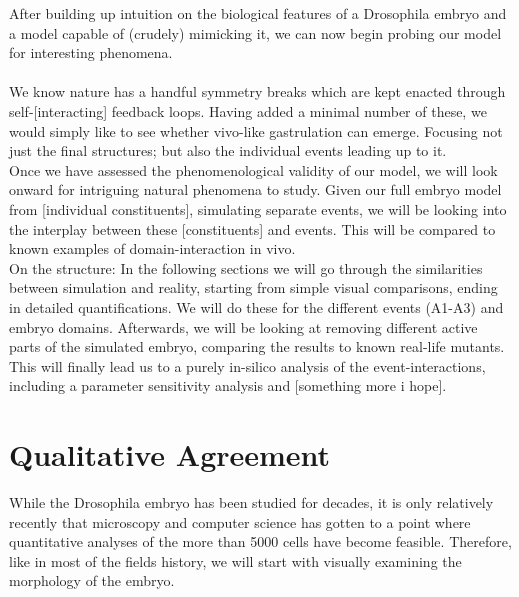 After building up intuition on the biological features of a Drosophila embryo and a model capable of (crudely) mimicking it, we can now begin probing our model for interesting phenomena.\\
\\
We know nature has a handful symmetry breaks which are kept enacted through self-[interacting] feedback loops. Having added a minimal number of these, we would simply like to see whether vivo-like gastrulation can emerge. Focusing not just the final structures; but also the individual events leading up to it. \\
 
Once we have assessed the phenomenological validity of our model, we will look onward for intriguing natural phenomena to study. Given our full embryo model from [individual constituents], simulating separate events, we will be looking into the interplay between these [constituents] and events. This will be compared to known examples of domain-interaction in vivo.\reph\\


On the structure: In the following sections we will go through the similarities between simulation and reality, starting from simple visual comparisons, ending in detailed quantifications. We will do these for the different events (A1-A3) and embryo domains. Afterwards, we will be looking at removing different active parts of the simulated embryo, comparing the results to known real-life mutants. This will finally lead us to a purely in-silico analysis of the event-interactions, including a parameter sensitivity analysis and [something more i hope].\\ 

\renewcommand{\contentsname}{Results Section Table of Contents}
 \setcounter{tocdepth}{2}
\localtableofcontents
\renewcommand{\contentsname}{Table of Contents}
 \setcounter{tocdepth}{1} 


\newpage

\section{Qualitative Agreement}
While the Drosophila embryo has been studied for decades, it is only relatively recently that microscopy and computer science has gotten to a point where quantitative analyses of the more than 5000 cells have become feasible. Therefore, like in most of the fields history, we will start with visually examining the morphology of the embryo. 


